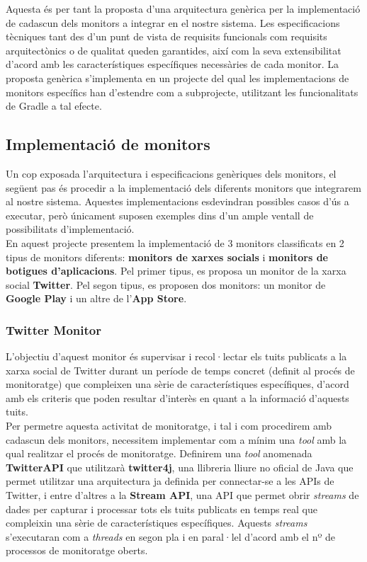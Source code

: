 Aquesta és per tant la proposta d'una arquitectura genèrica per la implementació de cadascun dels monitors a integrar en el nostre sistema. Les especificacions tècniques tant des d'un punt de vista de requisits funcionals com requisits arquitectònics o de qualitat queden garantides, així com la seva extensibilitat d'acord amb les característiques específiques necessàries de cada monitor. La proposta genèrica s'implementa en un projecte del qual les implementacions de monitors específics han d'estendre com a subprojecte, utilitzant les funcionalitats de Gradle a tal efecte.

\subsection{Implementació de monitors}

Un cop exposada l'arquitectura i especificacions genèriques dels monitors, el següent pas és procedir a la implementació dels diferents monitors que integrarem al nostre sistema. Aquestes implementacions esdevindran possibles casos d'ús a executar, però únicament suposen exemples dins d'un ample ventall de possibilitats d'implementació.\\

En aquest projecte presentem la implementació de 3 monitors classificats en 2 tipus de monitors diferents: \textbf{monitors de xarxes socials} i \textbf{monitors de botigues d'aplicacions}. Pel primer tipus, es proposa un monitor de la xarxa social \textbf{Twitter}. Pel segon tipus, es proposen dos monitors: un monitor de \textbf{Google Play} i un altre de l'\textbf{App Store}. 

\subsubsection{Twitter Monitor}

L'objectiu d'aquest monitor és supervisar i recol·lectar els tuits publicats a la xarxa social de Twitter durant un període de temps concret (definit al procés de monitoratge) que compleixen una sèrie de característiques específiques, d'acord amb els criteris que poden resultar d'interès en quant a la informació d'aquests tuits. \\

Per permetre aquesta activitat de monitoratge, i tal i com procedirem amb cadascun dels monitors, necessitem implementar com a mínim una \textit{tool} amb la qual realitzar el procés de monitoratge. Definirem una \textit{tool} anomenada \textbf{TwitterAPI} que utilitzarà \textbf{twitter4j}, una llibreria lliure no oficial de Java que permet utilitzar una arquitectura ja definida per connectar-se a les APIs de Twitter, i entre d'altres a la \textbf{Stream API}, una API que permet obrir \textit{streams} de dades per capturar i processar tots els tuits publicats en temps real que compleixin una sèrie de característiques específiques. Aquests \textit{streams} s'executaran com a \textit{threads} en segon pla i en paral·lel d'acord amb el nº de processos de monitoratge oberts.\\

